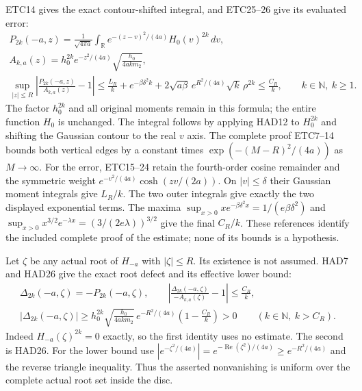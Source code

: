 ETC14 gives the exact contour-shifted integral, and
ETC25--26 give its evaluated error:
\begin{equation}\tag{HAD26}
\begin{gathered}
 P_{2k}(-a,z)=\frac1{\sqrt{4\pi a}}
       \int_{\mathbb R}e^{-(z-v)^2/(4a)}H_0(v)^{2k}\,dv,\\
 A_{k,a}(z)=h_0^{2k}e^{-z^2/(4a)}
                           \sqrt{\frac{h_0}{4akm_2}},\\
 \sup_{|z|\le R}
       \left|\frac{P_{2k}(-a,z)}{A_{k,a}(z)}-1\right|
 \le \frac{L_R}{k}+e^{-\beta\delta^2k}
         +2\sqrt{a\beta}\,e^{R^2/(4a)}\sqrt{k}\,\rho^{2k}
 \le\frac{C_R}{k},\qquad k\in\mathbb N,\ k\ge1.
\end{gathered}
\end{equation}
The factor $h_0^{2k}$ and all original moments remain in
this formula; the entire function $H_0$ is unchanged.
The integral follows by applying HAD12 to $H_0^{2k}$
and shifting the Gaussian contour to the real $v$ axis.
The complete proof ETC7--14 bounds both vertical edges
by a constant times
$\exp(-(M-R)^2/(4a))$ as $M\to\infty$.
For the error, ETC15--24 retain the fourth-order cosine
remainder and the symmetric weight
$e^{-v^2/(4a)}\cosh(zv/(2a))$. On $|v|\le\delta$
their Gaussian moment integrals give $L_R/k$.
The two outer integrals give exactly the two displayed
exponential terms. The maxima
$\sup_{x>0}xe^{-\beta\delta^2x}=1/(e\beta\delta^2)$
and $\sup_{x>0}x^{3/2}e^{-\lambda x}
=(3/(2e\lambda))^{3/2}$
give the final $C_R/k$.
These references identify the included complete proof
of the estimate; none of its bounds is a hypothesis.

Let $\zeta$ be any actual root of $H_{-a}$ with
$|\zeta|\le R$. Its existence is not assumed. HAD7 and
HAD26 give the exact root defect and its effective
lower bound:
\begin{equation}\tag{HAD27}
\begin{gathered}
 \Delta_{2k}(-a,\zeta)=-P_{2k}(-a,\zeta),\qquad
 \left|\frac{\Delta_{2k}(-a,\zeta)}{-A_{k,a}(\zeta)}-1\right|
                        \le\frac{C_R}{k},\\
 |\Delta_{2k}(-a,\zeta)|
 \ge h_0^{2k}\sqrt{\frac{h_0}{4akm_2}}\,
             e^{-R^2/(4a)}
             \left(1-\frac{C_R}{k}\right)>0
                \qquad(k\in\mathbb N,\ k>C_R).
\end{gathered}
\end{equation}
Indeed $H_{-a}(\zeta)^{2k}=0$ exactly, so the first
identity uses no estimate. The second is HAD26.
For the lower bound use
$|e^{-\zeta^2/(4a)}|
=e^{-\operatorname{Re}(\zeta^2)/(4a)}
\ge e^{-R^2/(4a)}$ and the reverse triangle inequality.
Thus the asserted nonvanishing is uniform over the
complete actual root set inside the disc.

